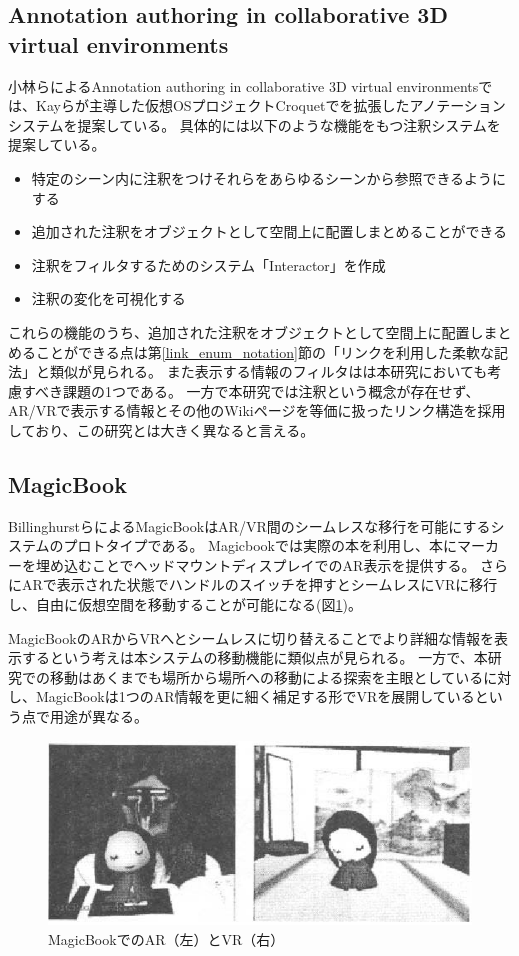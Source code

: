 \subsection{Annotation authoring in collaborative 3D virtual environments}
小林らによるAnnotation authoring in collaborative 3D virtual environments\cite{10.1145/1152399.1152452}では、Kayらが主導した仮想OSプロジェクトCroquet\cite{10.5555/1009376.1009395}でを拡張したアノテーションシステムを提案している。
具体的には以下のような機能をもつ注釈システムを提案している。
\begin{itemize} 
  \item 特定のシーン内に注釈をつけそれらをあらゆるシーンから参照できるようにする
  \item 追加された注釈をオブジェクトとして空間上に配置しまとめることができる
  \item 注釈をフィルタするためのシステム「Interactor」を作成
  \item 注釈の変化を可視化する
\end{itemize}
これらの機能のうち、追加された注釈をオブジェクトとして空間上に配置しまとめることができる点は第\ref{link_enum_notation}節の「リンクを利用した柔軟な記法」と類似が見られる。
また表示する情報のフィルタはは本研究においても考慮すべき課題の1つである。
一方で本研究では注釈という概念が存在せず、AR/VRで表示する情報とその他のWikiページを等価に扱ったリンク構造を採用しており、この研究とは大きく異なると言える。

\subsection{MagicBook}
BillinghurstらによるMagicBook\cite{10.1145/634067.634087}はAR/VR間のシームレスな移行を可能にするシステムのプロトタイプである。
Magicbookでは実際の本を利用し、本にマーカーを埋め込むことでヘッドマウントディスプレイでのAR表示を提供する。
さらにARで表示された状態でハンドルのスイッチを押すとシームレスにVRに移行し、自由に仮想空間を移動することが可能になる(図\ref{fig:MagicBook})。

MagicBookのARからVRへとシームレスに切り替えることでより詳細な情報を表示するという考えは本システムの移動機能に類似点が見られる。
一方で、本研究での移動はあくまでも場所から場所への移動による探索を主眼としているに対し、MagicBookは1つのAR情報を更に細く補足する形でVRを展開しているという点で用途が異なる。

\begin{figure}[H]
  \centering 
  \includegraphics[width=120mm]{images/MagicBook.png}
  \caption{MagicBookでのAR（左）とVR（右）} \label{fig:MagicBook}
\end{figure}


